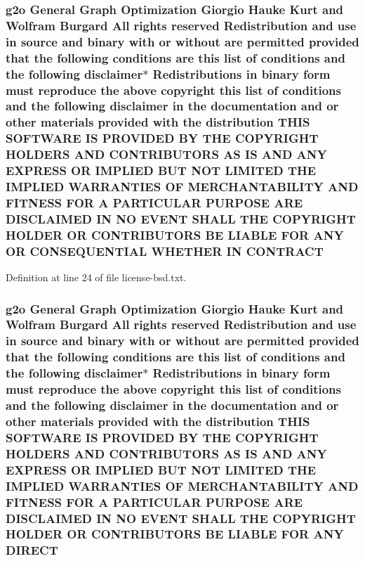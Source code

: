 \subsubsection[{\texorpdfstring{C\+O\+N\+T\+R\+A\+CT}{CONTRACT}}]{\setlength{\rightskip}{0pt plus 5cm}g2o General Graph Optimization Giorgio Hauke Kurt and Wolfram Burgard All rights reserved Redistribution and use in source and binary with or without are permitted provided that the following conditions are this list of conditions and the following disclaimer$\ast$ Redistributions in binary form must reproduce the above copyright this list of conditions and the following disclaimer in the documentation and or other materials provided with the distribution T\+H\+IS S\+O\+F\+T\+W\+A\+RE IS P\+R\+O\+V\+I\+D\+ED BY T\+HE C\+O\+P\+Y\+R\+I\+G\+HT H\+O\+L\+D\+E\+RS A\+ND C\+O\+N\+T\+R\+I\+B\+U\+T\+O\+RS AS IS A\+ND A\+NY E\+X\+P\+R\+E\+SS OR I\+M\+P\+L\+I\+ED B\+UT N\+OT L\+I\+M\+I\+T\+ED T\+HE I\+M\+P\+L\+I\+ED {\bf W\+A\+R\+R\+A\+N\+T\+I\+ES} OF M\+E\+R\+C\+H\+A\+N\+T\+A\+B\+I\+L\+I\+TY A\+ND F\+I\+T\+N\+E\+SS F\+OR A P\+A\+R\+T\+I\+C\+U\+L\+AR P\+U\+R\+P\+O\+SE A\+RE D\+I\+S\+C\+L\+A\+I\+M\+ED IN NO E\+V\+E\+NT S\+H\+A\+LL T\+HE C\+O\+P\+Y\+R\+I\+G\+HT H\+O\+L\+D\+ER OR C\+O\+N\+T\+R\+I\+B\+U\+T\+O\+RS BE L\+I\+A\+B\+LE F\+OR A\+NY OR C\+O\+N\+S\+E\+Q\+U\+E\+N\+T\+I\+AL W\+H\+E\+T\+H\+ER IN C\+O\+N\+T\+R\+A\+CT}\hypertarget{license-bsd_8txt_a7baf31f6ddb167c8cb580e4f3dd03f91}{}\label{license-bsd_8txt_a7baf31f6ddb167c8cb580e4f3dd03f91}


Definition at line 24 of file license-\/bsd.\+txt.

\subsubsection[{\texorpdfstring{D\+I\+R\+E\+CT}{DIRECT}}]{\setlength{\rightskip}{0pt plus 5cm}g2o General Graph Optimization Giorgio Hauke Kurt and Wolfram Burgard All rights reserved Redistribution and use in source and binary with or without are permitted provided that the following conditions are this list of conditions and the following disclaimer$\ast$ Redistributions in binary form must reproduce the above copyright this list of conditions and the following disclaimer in the documentation and or other materials provided with the distribution T\+H\+IS S\+O\+F\+T\+W\+A\+RE IS P\+R\+O\+V\+I\+D\+ED BY T\+HE C\+O\+P\+Y\+R\+I\+G\+HT H\+O\+L\+D\+E\+RS A\+ND C\+O\+N\+T\+R\+I\+B\+U\+T\+O\+RS AS IS A\+ND A\+NY E\+X\+P\+R\+E\+SS OR I\+M\+P\+L\+I\+ED B\+UT N\+OT L\+I\+M\+I\+T\+ED T\+HE I\+M\+P\+L\+I\+ED {\bf W\+A\+R\+R\+A\+N\+T\+I\+ES} OF M\+E\+R\+C\+H\+A\+N\+T\+A\+B\+I\+L\+I\+TY A\+ND F\+I\+T\+N\+E\+SS F\+OR A P\+A\+R\+T\+I\+C\+U\+L\+AR P\+U\+R\+P\+O\+SE A\+RE D\+I\+S\+C\+L\+A\+I\+M\+ED IN NO E\+V\+E\+NT S\+H\+A\+LL T\+HE C\+O\+P\+Y\+R\+I\+G\+HT H\+O\+L\+D\+ER OR C\+O\+N\+T\+R\+I\+B\+U\+T\+O\+RS BE L\+I\+A\+B\+LE F\+OR A\+NY D\+I\+R\+E\+CT}\hypertarget{license-bsd_8txt_a8ea6ac62e7a976af5669e7f528e4efc3}{}\label{license-bsd_8txt_a8ea6ac62e7a976af5669e7f528e4efc3}


